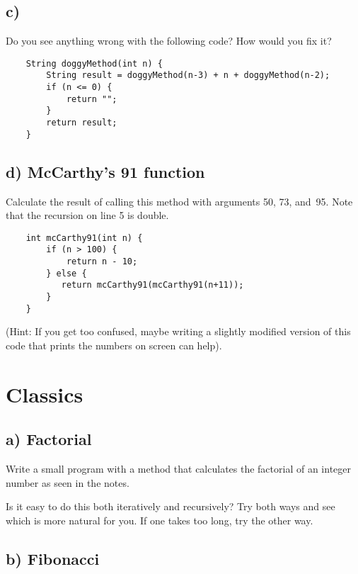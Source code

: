 \documentclass{article}
\begin{document}
\subsection*{c)}
\label{sec:b-3}

Do you see anything wrong with the following code? How would you fix it?

\begin{verbatim}
    String doggyMethod(int n) {
        String result = doggyMethod(n-3) + n + doggyMethod(n-2);
        if (n <= 0) {
            return "";
        }
        return result;
    }
\end{verbatim}

\subsection*{d) McCarthy's 91 function}
\label{sec:c}

Calculate the result of calling this method with arguments 50, 73, 
and~95. Note that the recursion on line 5 is double. 

\begin{verbatim}
    int mcCarthy91(int n) {
        if (n > 100) {
            return n - 10;
        } else {
           return mcCarthy91(mcCarthy91(n+11));
        }
    }
\end{verbatim}

(Hint: If you get too confused, maybe writing a slightly modified
version of this code that prints the numbers on screen can help).

\section{Classics}

\subsection{a) Factorial }

Write a small program with a method that calculates the factorial of an
integer number as seen in the notes. 

Is it easy to do this both iteratively and recursively? Try both ways
and see which is more natural for you. If one takes too long, try the
other way. 

\subsection{b) Fibonacci }
\end{document}
